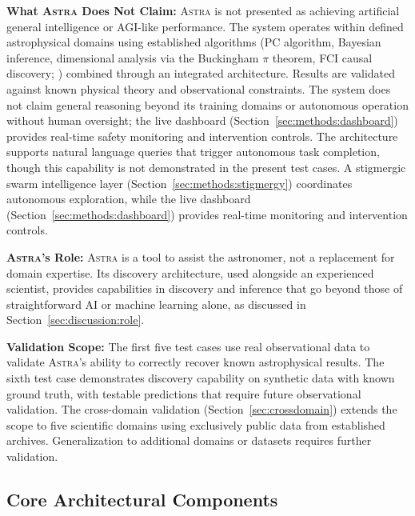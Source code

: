 \documentclass[usenatbib]{rasti}
\newcommand{\astra}{\textsc{Astra}\xspace}
\newcommand{\pc}{PC\xspace}
\newcommand{\fci}{FCI\xspace}
\begin{document}
\textbf{What \astra Does Not Claim:}
\astra is not presented as achieving artificial general intelligence or AGI-like performance.
The system operates within defined astrophysical domains using established algorithms (\pc algorithm, Bayesian inference, dimensional analysis via the Buckingham $\pi$ theorem, \fci causal discovery; \citealt{Zhang2008}) combined through an integrated architecture.
Results are validated against known physical theory and observational constraints.
The system does not claim general reasoning beyond its training domains or autonomous operation without human oversight; the live dashboard (Section~\ref{sec:methods:dashboard}) provides real-time safety monitoring and intervention controls.
The architecture supports natural language queries that trigger autonomous task completion, though this capability is not demonstrated in the present test cases.
A stigmergic swarm intelligence layer (Section~\ref{sec:methods:stigmergy}) coordinates autonomous exploration, while the live dashboard (Section~\ref{sec:methods:dashboard}) provides real-time monitoring and intervention controls.

\textbf{\astra's Role:}
\astra is a tool to assist the astronomer, not a replacement for domain expertise.
Its discovery architecture, used alongside an experienced scientist, provides capabilities in discovery and inference that go beyond those of straightforward AI or machine learning alone, as discussed in Section~\ref{sec:discussion:role}.

\textbf{Validation Scope:}
The first five test cases use real observational data to validate \astra's ability to correctly recover known astrophysical results.
The sixth test case demonstrates discovery capability on synthetic data with known ground truth, with testable predictions that require future observational validation.
The cross-domain validation (Section~\ref{sec:crossdomain}) extends the scope to five scientific domains using exclusively public data from established archives.
Generalization to additional domains or datasets requires further validation.

\subsection{Core Architectural Components}
\label{sec:methods:components}
\end{document}
